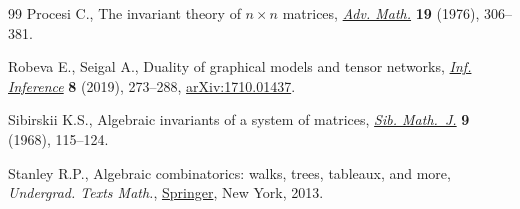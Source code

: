 \begin{thebibliography}{99}
Procesi C., The invariant theory of {$n\times n$} matrices, \href{https://doi.org/10.1016/0001-8708(76)90027-X}{\textit{Adv. Math.}}
  \textbf{19} (1976), 306--381.

Robeva E., Seigal A., Duality of graphical models and tensor networks,
  \href{https://doi.org/10.1093/imaiai/iay009}{\textit{Inf. Inference}} \textbf{8} (2019), 273--288, \href{https://arxiv.org/abs/1710.01437}{arXiv:1710.01437}.

Sibirskii K.S., Algebraic invariants of a system of matrices, \href{https://doi.org/10.1007/BF02196663}{\textit{Sib.
  Math.~J.}} \textbf{9} (1968), 115--124.

Stanley R.P., Algebraic combinatorics: walks, trees, tableaux, and more,
  \textit{Undergrad. Texts Math.}, \href{https://doi.org/10.1007/978-1-4614-6998-8}{Springer}, New York, 2013.

\end{thebibliography}

